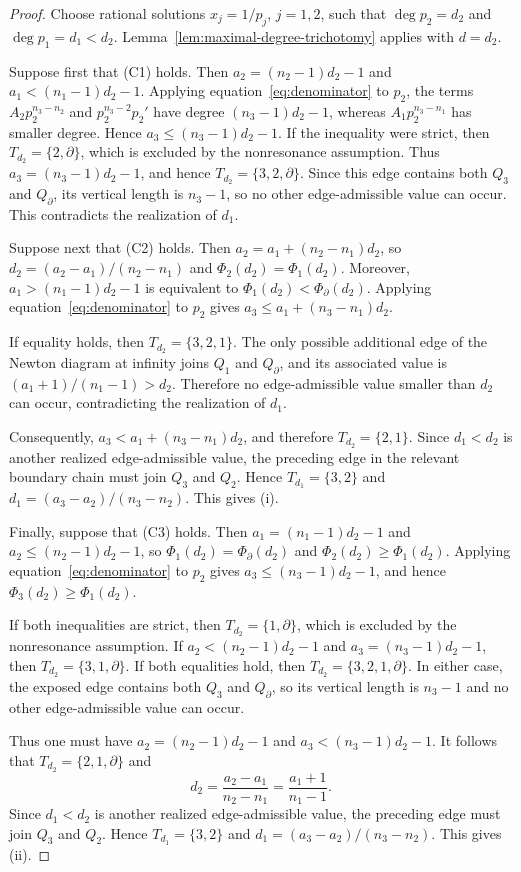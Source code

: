 \documentclass[12pt,a4paper]{amsart}
\numberwithin{theorem}{section}
\theoremstyle{definition}
\begin{document}
	\begin{proof}
		Choose rational solutions $x_j=1/p_j$, $j=1,2$, such that $\deg p_2=d_2$ and $\deg p_1=d_1<d_2$. Lemma~\ref{lem:maximal-degree-trichotomy} applies with $d=d_2$.
		
		Suppose first that {\rm (C1)} holds. Then $a_2=(n_2-1)d_2-1$ and $a_1<(n_1-1)d_2-1$. Applying equation~\eqref{eq:denominator} to $p_2$, the terms $A_2p_2^{n_3-n_2}$ and $p_2^{n_3-2}p_2'$ have degree $(n_3-1)d_2-1$, whereas $A_1p_2^{n_3-n_1}$ has smaller degree. Hence $a_3\leq(n_3-1)d_2-1$. If the inequality were strict, then $T_{d_2}=\{2,\partial\}$, which is excluded by the nonresonance assumption. Thus $a_3=(n_3-1)d_2-1$, and hence $T_{d_2}=\{3,2,\partial\}$. Since this edge contains both $Q_3$ and $Q_\partial$, its vertical length is $n_3-1$, so no other edge-admissible value can occur. This contradicts the realization of $d_1$.
		
		Suppose next that {\rm (C2)} holds. Then $a_2=a_1+(n_2-n_1)d_2$, so $d_2=(a_2-a_1)/(n_2-n_1)$ and $\Phi_2(d_2)=\Phi_1(d_2)$. Moreover, $a_1>(n_1-1)d_2-1$ is equivalent to $\Phi_1(d_2)<\Phi_\partial(d_2)$. Applying equation~\eqref{eq:denominator} to $p_2$ gives $a_3\leq a_1+(n_3-n_1)d_2$.
		
		If equality holds, then $T_{d_2}=\{3,2,1\}$. The only possible additional edge of the Newton diagram at infinity joins $Q_1$ and $Q_\partial$, and its associated value is $(a_1+1)/(n_1-1)>d_2$. Therefore no edge-admissible value smaller than $d_2$ can occur, contradicting the realization of $d_1$.
		
		Consequently, $a_3<a_1+(n_3-n_1)d_2$, and therefore $T_{d_2}=\{2,1\}$. Since $d_1<d_2$ is another realized edge-admissible value, the preceding edge in the relevant boundary chain must join $Q_3$ and $Q_2$. Hence $T_{d_1}=\{3,2\}$ and $d_1=(a_3-a_2)/(n_3-n_2)$. This gives {\rm (i)}.
		
		Finally, suppose that {\rm (C3)} holds. Then $a_1=(n_1-1)d_2-1$ and $a_2\leq(n_2-1)d_2-1$, so $\Phi_1(d_2)=\Phi_\partial(d_2)$ and $\Phi_2(d_2)\geq\Phi_1(d_2)$. Applying equation~\eqref{eq:denominator} to $p_2$ gives $a_3\leq(n_3-1)d_2-1$, and hence $\Phi_3(d_2)\geq\Phi_1(d_2)$.
		
		If both inequalities are strict, then $T_{d_2}=\{1,\partial\}$, which is excluded by the nonresonance assumption. If $a_2<(n_2-1)d_2-1$ and $a_3=(n_3-1)d_2-1$, then $T_{d_2}=\{3,1,\partial\}$. If both equalities hold, then $T_{d_2}=\{3,2,1,\partial\}$. In either case, the exposed edge contains both $Q_3$ and $Q_\partial$, so its vertical length is $n_3-1$ and no other edge-admissible value can occur.
		
		Thus one must have $a_2=(n_2-1)d_2-1$ and $a_3<(n_3-1)d_2-1$. It follows that $T_{d_2}=\{2,1,\partial\}$ and
		\[
		d_2=\frac{a_2-a_1}{n_2-n_1}=\frac{a_1+1}{n_1-1}.
		\]
		Since $d_1<d_2$ is another realized edge-admissible value, the preceding edge must join $Q_3$ and $Q_2$. Hence $T_{d_1}=\{3,2\}$ and $d_1=(a_3-a_2)/(n_3-n_2)$. This gives {\rm (ii)}.
	\end{proof}
	
\end{document}
